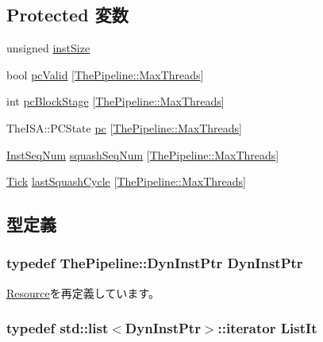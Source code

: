 \subsection*{Protected 変数}
\begin{DoxyCompactItemize}
\item 
unsigned \hyperlink{classFetchSeqUnit_ae3208e633eb913a59f8a49ba2c65840c}{instSize}
\item 
bool \hyperlink{classFetchSeqUnit_ae0f86f031bb34b0540e5ebcfaa2de630}{pcValid} \mbox{[}\hyperlink{namespaceThePipeline_ac9c0bbe9cf27d93e08ea8ccc4096e633}{ThePipeline::MaxThreads}\mbox{]}
\item 
int \hyperlink{classFetchSeqUnit_acd6cfe08097e99df8b2ef586c47d87fa}{pcBlockStage} \mbox{[}\hyperlink{namespaceThePipeline_ac9c0bbe9cf27d93e08ea8ccc4096e633}{ThePipeline::MaxThreads}\mbox{]}
\item 
TheISA::PCState \hyperlink{classFetchSeqUnit_a61bb24b7355c86288cba2cd9d51ad1ed}{pc} \mbox{[}\hyperlink{namespaceThePipeline_ac9c0bbe9cf27d93e08ea8ccc4096e633}{ThePipeline::MaxThreads}\mbox{]}
\item 
\hyperlink{inst__seq_8hh_a258d93d98edaedee089435c19ea2ea2e}{InstSeqNum} \hyperlink{classFetchSeqUnit_a8c48389ee147811c1be413cdd4be4b68}{squashSeqNum} \mbox{[}\hyperlink{namespaceThePipeline_ac9c0bbe9cf27d93e08ea8ccc4096e633}{ThePipeline::MaxThreads}\mbox{]}
\item 
\hyperlink{base_2types_8hh_a5c8ed81b7d238c9083e1037ba6d61643}{Tick} \hyperlink{classFetchSeqUnit_a07ac7fa00a59be2904eaa76d4735681e}{lastSquashCycle} \mbox{[}\hyperlink{namespaceThePipeline_ac9c0bbe9cf27d93e08ea8ccc4096e633}{ThePipeline::MaxThreads}\mbox{]}
\end{DoxyCompactItemize}


\subsection{型定義}
\hypertarget{classFetchSeqUnit_af9d0c8a46736ba6aa2d8bb94da1a5e73}{
\subsubsection[{DynInstPtr}]{\setlength{\rightskip}{0pt plus 5cm}typedef {\bf ThePipeline::DynInstPtr} {\bf DynInstPtr}}}
\label{classFetchSeqUnit_af9d0c8a46736ba6aa2d8bb94da1a5e73}


\hyperlink{classResource_af9d0c8a46736ba6aa2d8bb94da1a5e73}{Resource}を再定義しています。\hypertarget{classFetchSeqUnit_a184cb829e22cc656acb41864f68f51ea}{
\subsubsection[{ListIt}]{\setlength{\rightskip}{0pt plus 5cm}typedef {\bf std::list}$<${\bf DynInstPtr}$>$::iterator {\bf ListIt}}}
\label{classFetchSeqUnit_a184cb829e22cc656acb41864f68f51ea}


